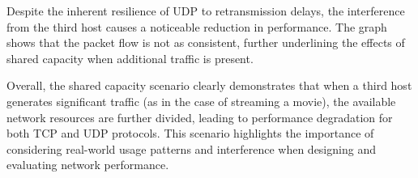 \begin{enumerate}

                Despite the inherent resilience of UDP to retransmission delays, the interference from the third host causes a noticeable reduction in performance. 
                The graph shows that the packet flow is not as consistent, further underlining the effects of shared capacity when additional traffic is present.

                Overall, the shared capacity scenario clearly demonstrates that when a third host generates significant traffic (as in the case of streaming a movie), the available network resources are further divided, leading to performance degradation for both TCP and UDP protocols. 
                This scenario highlights the importance of considering real-world usage patterns and interference when designing and evaluating network performance.

        \end{enumerate}
